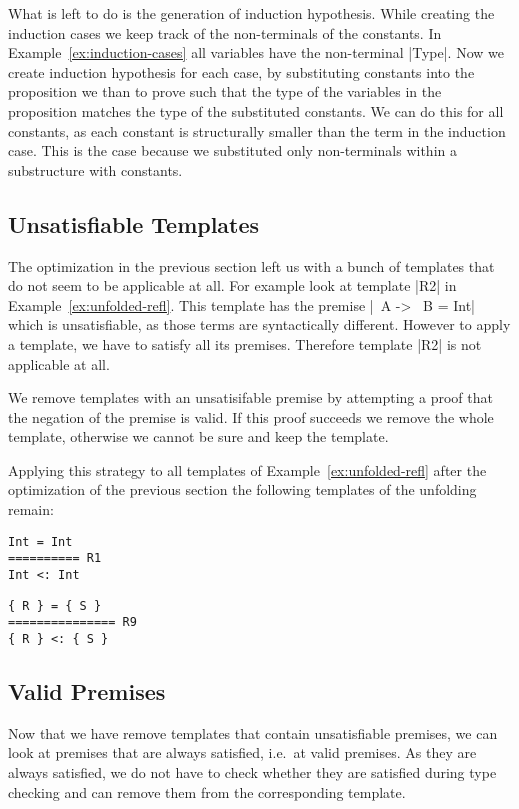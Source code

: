 What is left to do is the generation of induction hypothesis. While
creating the induction cases we keep track of the non-terminals of the
constants. In Example~\ref{ex:induction-cases} all variables have the
non-terminal \code|Type|. Now we create induction hypothesis for each
case, by substituting constants into the proposition we than to prove
such that the type of the variables in the proposition matches the
type of the substituted constants. We can do this for all constants,
as each constant is structurally smaller than the term in the
induction case. This is the case because we substituted only
non-terminals within a substructure with constants.

\subsection{Unsatisfiable Templates}
The optimization in the previous section left us with a bunch of
templates that do not seem to be applicable at all. For example look
at template \code|R2| in Example~\ref{ex:unfolded-refl}. This template
has the premise \code|~A -> ~B = Int| which is unsatisfiable, as those
terms are syntactically different. However to apply a template, we
have to satisfy all its premises. Therefore template \code|R2| is not
applicable at all.

We remove templates with an unsatisifable premise by attempting a
proof that the negation of the premise is valid. If this proof
succeeds we remove the whole template, otherwise we cannot be sure and
keep the template.

Applying this strategy to all templates of
Example~\ref{ex:unfolded-refl} after the optimization of the previous
section the following templates of the unfolding remain:
\begin{multicols}{2}
\begin{lstlisting}[language=sltc]
Int = Int
========== R1
Int <: Int
\end{lstlisting}
\begin{lstlisting}[language=sltc]
{ R } = { S }
=============== R9
{ R } <: { S }
\end{lstlisting}
\end{multicols}

\subsection{Valid Premises}
Now that we have remove templates that contain unsatisfiable premises,
we can look at premises that are always satisfied, i.e.\ at valid
premises. As they are always satisfied, we do not have to check
whether they are satisfied during type checking and can remove them
from the corresponding template.

